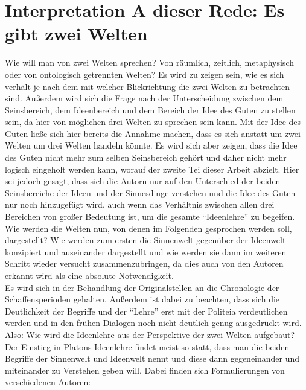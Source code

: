 \section{Interpretation A dieser Rede: Es gibt zwei Welten}
Wie will man von zwei Welten sprechen? Von räumlich, zeitlich, metaphysisch oder von ontologisch getrennten Welten? Es wird zu zeigen sein, wie es sich verhält je nach dem mit welcher Blickrichtung die zwei Welten zu betrachten sind. Außerdem wird sich die Frage nach der Unterscheidung zwischen dem Seinsbereich, dem Ideenbereich und dem Bereich der Idee des Guten zu stellen sein, da hier von möglichen drei Welten zu sprechen sein kann. Mit der Idee des Guten ließe sich hier bereits die Annahme machen, dass es sich anstatt um zwei Welten um drei Welten handeln könnte. Es wird sich aber zeigen, dass die Idee des Guten nicht mehr zum selben Seinsbereich gehört und daher nicht mehr logisch eingeholt werden kann, worauf der zweite Tei dieser Arbeit abzielt. Hier sei jedoch gesagt, dass sich die Autorn nur auf den Unterschied der beiden Seinsbereiche der Ideen und der Sinnesdinge verstehen und die Idee des Guten nur noch hinzugefügt wird, auch wenn das Verhältnis zwischen allen drei Bereichen von großer Bedeutung ist, um die gesamte \enquote{Ideenlehre} zu begeifen.\\
Wie werden die Welten nun, von denen im Folgenden gesprochen werden soll, dargestellt? Wie werden zum ersten die Sinnenwelt gegenüber der Ideenwelt konzipiert und auseinander dargestellt und wie werden sie dann im weiteren Schritt wieder versucht zusammenzubringen, da dies auch von den Autoren erkannt wird als eine absolute Notwendigkeit.\\
Es wird sich in der Behandlung der Originalstellen an die Chronologie der Schaffensperioden gehalten. Außerdem ist dabei zu beachten, dass sich die Deutlichkeit der Begriffe und der \enquote{Lehre} erst mit der Politeia verdeutlichen werden und in den frühen Dialogen noch nicht deutlich genug ausgedrückt wird. 
Also: Wie wird die Ideenlehre aus der Perspektive der zwei Welten aufgebaut?\\
Der Einstieg in Platons Ideenlehre findet meist so statt, dass man die beiden Begriffe der Sinnenwelt und Ideenwelt nennt und diese dann gegeneinander und miteinander zu Verstehen geben will. Dabei finden sich Formulierungen von verschiedenen Autoren: 
